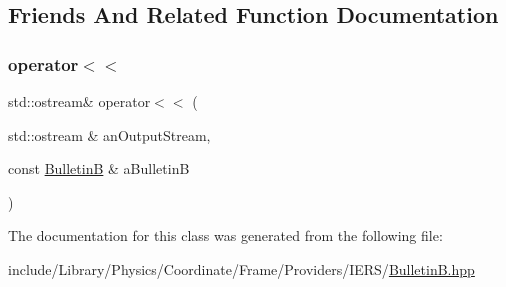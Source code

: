 \subsection{Friends And Related Function Documentation}
\mbox{\label{classlibrary_1_1physics_1_1coord_1_1frame_1_1provider_1_1iers_1_1_bulletin_b_a36d9e78a5de0361186ca1cb63ab6f1ee}} 
\subsubsection{\texorpdfstring{operator$<$$<$}{operator<<}}
{\footnotesize\ttfamily std\+::ostream\& operator$<$$<$ (\begin{DoxyParamCaption}\item[{std\+::ostream \&}]{an\+Output\+Stream,  }\item[{const \hyperlink{classlibrary_1_1physics_1_1coord_1_1frame_1_1provider_1_1iers_1_1_bulletin_b}{BulletinB} \&}]{a\+BulletinB }\end{DoxyParamCaption})\hspace{0.3cm}{\ttfamily [friend]}}



The documentation for this class was generated from the following file\+:\begin{DoxyCompactItemize}
\item 
include/\+Library/\+Physics/\+Coordinate/\+Frame/\+Providers/\+I\+E\+R\+S/\hyperlink{_bulletin_b_8hpp}{Bulletin\+B.\+hpp}\end{DoxyCompactItemize}
